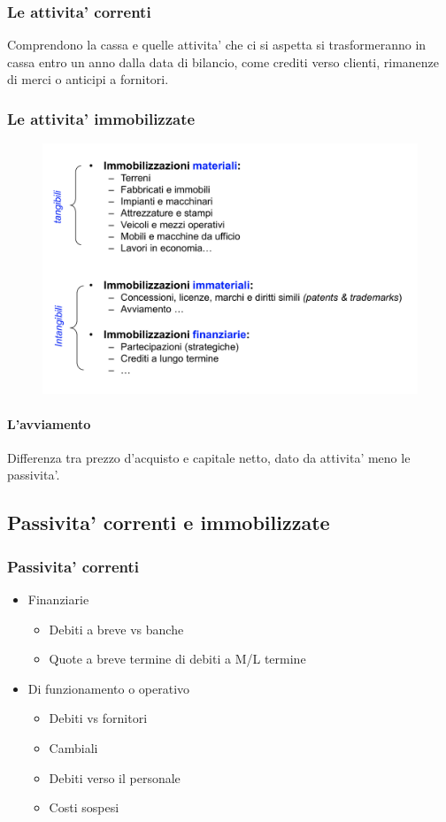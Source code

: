 \documentclass{report}
\begin{document}
	\subsubsection{Le attivita' correnti}
	Comprendono la cassa e quelle attivita' che ci si aspetta si trasformeranno in cassa entro un anno dalla data di bilancio, come crediti verso clienti, rimanenze di merci o anticipi a fornitori.
	\newpage
	\subsubsection{Le attivita' immobilizzate}
	\begin{figure}[h]
		\centering
		\includegraphics[width=0.7\linewidth]{attivita-immobilizzate}
		\label{fig:attivita-immobilizzate}
	\end{figure}
	\paragraph{L'avviamento} Differenza tra prezzo d'acquisto e capitale netto, dato da attivita' meno le passivita'.
	\subsection{Passivita' correnti e immobilizzate}
	\subsubsection{Passivita' correnti}
	\begin{itemize}
		\item Finanziarie
		\begin{itemize}
			\item Debiti a breve vs banche
			\item Quote a breve termine di debiti a M/L termine\\
		\end{itemize}
		\item Di funzionamento o operativo
		\begin{itemize}
			\item Debiti vs fornitori
			\item Cambiali
			\item Debiti verso il personale
			\item Costi sospesi
		\end{itemize}
	\end{itemize}
\end{document}
